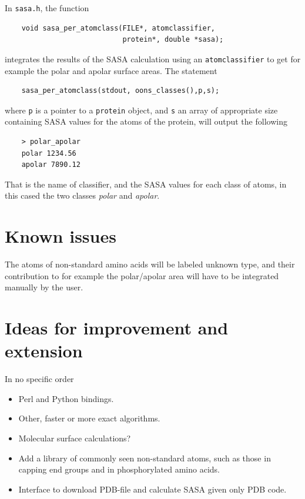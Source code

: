 \documentclass[a4paper,11pt]{article}
\begin{document}
In \texttt{sasa.h}, the function
\begin{verbatim}
    void sasa_per_atomclass(FILE*, atomclassifier, 
                            protein*, double *sasa);
\end{verbatim}
integrates the results of the SASA calculation using an
\texttt{atomclassifier} to get for example the polar and apolar
surface areas. The statement
\begin{verbatim}
    sasa_per_atomclass(stdout, oons_classes(),p,s);
\end{verbatim}
where \texttt{p} is a pointer to a \texttt{protein} object, and
\texttt{s} an array of appropriate size containing SASA values for the
atoms of the protein, will output the following
\begin{verbatim}
    > polar_apolar
    polar 1234.56
    apolar 7890.12 
\end{verbatim}
That is the name of classifier, and the SASA values for each class of
atoms, in this cased the two classes \emph{polar} and \emph{apolar}.

\section{Known issues}

The atoms of non-standard amino acids will be labeled unknown type,
and their contribution to for example the polar/apolar area will have
to be integrated manually by the user.

\section{Ideas for improvement and extension}

In no specific order
\begin{itemize}
\item Perl and Python bindings.
\item Other, faster or more exact algorithms.
\item Molecular surface calculations?
\item Add a library of commonly seen non-standard atoms, such as those
  in capping end groups and in phosphorylated amino acids.
\item Interface to download PDB-file and calculate SASA given only PDB
  code.
\end{itemize}
\end{document}
